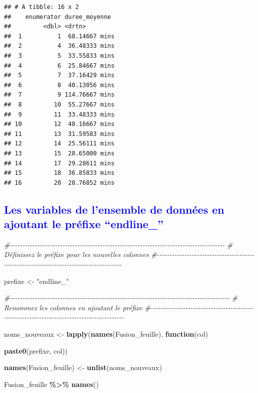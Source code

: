 \documentclass[
]{article}
\newenvironment{Shaded}{\begin{snugshade}}{\end{snugshade}}
\newcommand{\CommentTok}[1]{\textcolor[rgb]{0.56,0.35,0.01}{\textit{#1}}}
\newcommand{\ControlFlowTok}[1]{\textcolor[rgb]{0.13,0.29,0.53}{\textbf{#1}}}
\newcommand{\FunctionTok}[1]{\textcolor[rgb]{0.13,0.29,0.53}{\textbf{#1}}}
\newcommand{\NormalTok}[1]{#1}
\newcommand{\OtherTok}[1]{\textcolor[rgb]{0.56,0.35,0.01}{#1}}
\newcommand{\SpecialCharTok}[1]{\textcolor[rgb]{0.81,0.36,0.00}{\textbf{#1}}}
\newcommand{\StringTok}[1]{\textcolor[rgb]{0.31,0.60,0.02}{#1}}
\begin{document}
\begin{verbatim}
## # A tibble: 16 x 2
##    enumerator duree_moyenne 
##         <dbl> <drtn>        
##  1          1  68.14667 mins
##  2          4  36.48333 mins
##  3          5  33.55833 mins
##  4          6  25.84667 mins
##  5          7  37.16429 mins
##  6          8  40.13056 mins
##  7          9 114.76667 mins
##  8         10  55.27667 mins
##  9         11  33.48333 mins
## 10         12  48.16667 mins
## 11         13  31.59583 mins
## 12         14  25.56111 mins
## 13         15  28.65000 mins
## 14         17  29.28611 mins
## 15         18  36.85833 mins
## 16         20  28.76852 mins
\end{verbatim}

\textcolor{blue}{\subsection{Les variables de l’ensemble de données en ajoutant le préfixe “endline\_” }}

\begin{Shaded}
\begin{Highlighting}[]
\CommentTok{\#{-}{-}{-}{-}{-}{-}{-}{-}{-}{-}{-}{-}{-}{-}{-}{-}{-}{-}{-}{-}{-}{-}{-}{-}{-}{-}{-}{-}{-}{-}{-}{-}{-}{-}{-}{-}{-}{-}{-}{-}{-}{-}{-}{-}{-}{-}{-}{-}{-}{-}{-}{-}{-}{-}{-}{-}{-}{-}{-}{-}{-}{-}{-}{-}{-}{-}{-}{-}{-}{-}{-}{-}{-}{-}{-}{-}{-}{-}{-}{-}{-}{-}{-}{-}{-}{-}}
\CommentTok{\# Définissez le préfixe pour les nouvelles colonnes}
\CommentTok{\#{-}{-}{-}{-}{-}{-}{-}{-}{-}{-}{-}{-}{-}{-}{-}{-}{-}{-}{-}{-}{-}{-}{-}{-}{-}{-}{-}{-}{-}{-}{-}{-}{-}{-}{-}{-}{-}{-}{-}{-}{-}{-}{-}{-}{-}{-}{-}{-}{-}{-}{-}{-}{-}{-}{-}{-}{-}{-}{-}{-}{-}{-}{-}{-}{-}{-}{-}{-}{-}{-}{-}{-}{-}{-}{-}{-}{-}{-}{-}{-}{-}{-}{-}{-}{-}{-}}

\NormalTok{prefixe }\OtherTok{\textless{}{-}} \StringTok{"endline\_"}

\CommentTok{\#{-}{-}{-}{-}{-}{-}{-}{-}{-}{-}{-}{-}{-}{-}{-}{-}{-}{-}{-}{-}{-}{-}{-}{-}{-}{-}{-}{-}{-}{-}{-}{-}{-}{-}{-}{-}{-}{-}{-}{-}{-}{-}{-}{-}{-}{-}{-}{-}{-}{-}{-}{-}{-}{-}{-}{-}{-}{-}{-}{-}{-}{-}{-}{-}{-}{-}{-}{-}{-}{-}{-}{-}{-}{-}{-}{-}{-}{-}{-}{-}{-}{-}{-}{-}{-}{-}{-}{-}}
\CommentTok{\# Renommez les colonnes en ajoutant le préfixe}
\CommentTok{\#{-}{-}{-}{-}{-}{-}{-}{-}{-}{-}{-}{-}{-}{-}{-}{-}{-}{-}{-}{-}{-}{-}{-}{-}{-}{-}{-}{-}{-}{-}{-}{-}{-}{-}{-}{-}{-}{-}{-}{-}{-}{-}{-}{-}{-}{-}{-}{-}{-}{-}{-}{-}{-}{-}{-}{-}{-}{-}{-}{-}{-}{-}{-}{-}{-}{-}{-}{-}{-}{-}{-}{-}{-}{-}{-}{-}{-}{-}{-}{-}{-}{-}{-}{-}{-}{-}{-}{-}{-}}

\NormalTok{noms\_nouveaux }\OtherTok{\textless{}{-}} \FunctionTok{lapply}\NormalTok{(}\FunctionTok{names}\NormalTok{(Fusion\_feuille), }\ControlFlowTok{function}\NormalTok{(col)}
  
  \FunctionTok{paste0}\NormalTok{(prefixe, col))}

\FunctionTok{names}\NormalTok{(Fusion\_feuille) }\OtherTok{\textless{}{-}} \FunctionTok{unlist}\NormalTok{(noms\_nouveaux)}


\NormalTok{Fusion\_feuille }\SpecialCharTok{\%\textgreater{}\%}
\FunctionTok{names}\NormalTok{()}
\end{Highlighting}
\end{Shaded}
\end{document}
